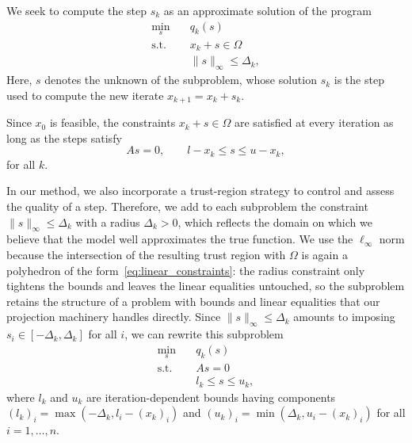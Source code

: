 \documentclass{article}
\numberwithin{equation}{section}
\theoremstyle{plain}
\begin{document}
	We seek to compute the step $s_k$ as an approximate solution of the program
	\begin{align*}
		\min_{s} \quad& q_k(s)  \\
		\text{s.t.}  \quad & x_k+s \in \Omega \\ 
		& \|s\|_\infty \le \Delta_k,
	\end{align*}	
	Here, $s$ denotes the unknown of the subproblem, whose solution $s_k$ is the step used to compute the new iterate $x_{k+1}=x_k+s_k$.
	
	Since $x_0$ is feasible, the constraints $x_k+s\in \Omega$ are satisfied at every iteration as long as the steps satisfy
	\[As = 0, \qquad l - x_k \le s \le u-x_k,\]
	for all $k$.
	
	In our method, we also incorporate a trust-region strategy to control and assess the quality of a step. Therefore, we add to each subproblem the constraint $\|s\|_\infty \le \Delta_k$ with a radius $\Delta_k > 0$, which reflects the domain on which we believe that the model well approximates the true function. We use the $\ell_\infty$ norm because the intersection of the resulting trust region with $\Omega$ is again a polyhedron of the form~\eqref{eq:linear_constraints}: the radius constraint only tightens the bounds and leaves the linear equalities untouched, so the subproblem retains the structure of a problem with bounds and linear equalities that our projection machinery handles directly. Since $\|s\|_\infty \le \Delta_k$ amounts to imposing $s_i \in [-\Delta_k,\Delta_k]$ for all $i$, we can rewrite this subproblem	
	\begin{subequations}\label{pb:quadratic_subproblem} 
		\begin{align}
			\min_{s} \quad& q_k(s)  \\
			\text{s.t.}  \quad & As=0 \\
			& l_k \le s \le u_k,
		\end{align}	
	\end{subequations}
	where $l_k$ and $u_k$ are iteration-dependent bounds having components $(l_k)_i = \max\left(-\Delta_k,l_i-(x_k)_i\right)$ and $(u_k)_i = \min\left(\Delta_k,u_i-(x_k)_i\right)$ for all $i=1,\ldots,n$.
	
\end{document}
